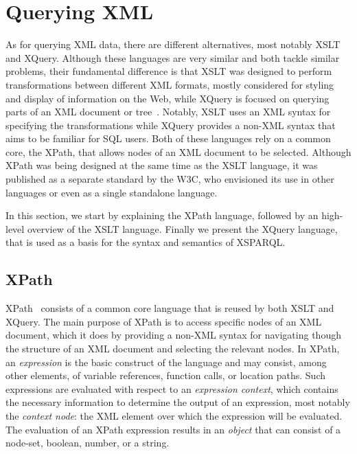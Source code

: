 
\section{Querying XML}
\label{sec:prelim-xquery}

As for querying \ac{XML} data, there are different alternatives, most notably \ac{XSLT} and XQuery.
%
Although these languages are very similar and both tackle similar problems, their fundamental difference is that XSLT
was designed to perform transformations between different \ac{XML} formats, mostly considered for styling and display of
information on the Web, while XQuery is focused on querying parts of an \ac{XML} document or
tree~\cite{KatzChamberlinKay:2003aa}.  Notably, XSLT uses an \ac{XML} syntax for specifying the transformations while
XQuery provides a non-\ac{XML} syntax that aims to be familiar for SQL users.
%
Both of these languages rely on a common core, the \ac{XPath}, that allows nodes of an \ac{XML} document to be selected.
Although \ac{XPath} was being designed at the same time as the XSLT language, it was published as a separate standard by
the \ac{W3C}, who envisioned its use in other languages or even as a single standalone language.
%

In this section, we start by explaining the \ac{XPath} language, followed by an high-level overview of the XSLT language.
Finally we present the XQuery language, that is used as a basis for the syntax and semantics of XSPARQL.



\subsection{XPath}
\label{sec:xpath}

\ac{XPath}~\cite{BerglundBoagChamberlin:2010aa} consists of a common core language that is reused by both \ac{XSLT} and
XQuery.  The main purpose of \ac{XPath} is to access specific nodes of an \ac{XML} document, which it does by providing
a non-\ac{XML} syntax for navigating though the structure of an \ac{XML} document and selecting the relevant nodes.
%
In \ac{XPath}, an \emph{expression} is the basic construct of the language and may consist, among other elements, of
variable references, function calls, or location paths.
%
Such expressions are evaluated with respect to an \emph{expression context}, which contains the necessary information to
determine the output of an expression, most notably the \emph{context node}: the \ac{XML} element over which the
expression will be evaluated.  The evaluation of an \ac{XPath} expression results in an \emph{object} that can consist
of a node-set, boolean, number, or a string.
%

